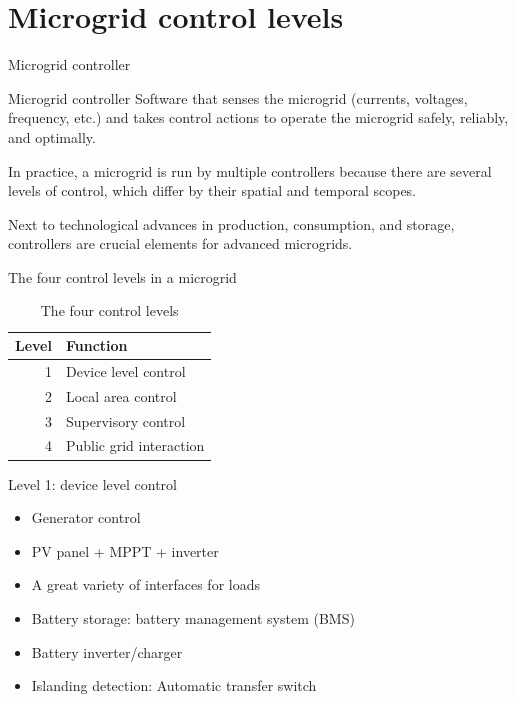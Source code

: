 \section{Microgrid control levels}

\begin{frame}{Microgrid controller}


\begin{block}{Microgrid controller}
Software that senses the microgrid (currents, voltages, frequency, etc.) and takes control actions to operate the microgrid safely, reliably, and optimally.
\end{block}

In practice, a microgrid is run by multiple controllers because there are several levels of control, which differ by their spatial and temporal scopes.

Next to technological advances in production, consumption, and storage, controllers are crucial elements for advanced microgrids.
\end{frame}

\begin{frame}{The four control levels in a microgrid}
 \begin{table}[H]
    \centering
    \caption{The four control levels}
    \begin{tabular}{@{} rl @{}}
	\toprule
	\textbf{Level} & \textbf{Function} \\
        \midrule
	1 & Device level control \\
	2 & Local area control \\
	3 & Supervisory control \\
	4 & Public grid interaction \\
      \bottomrule
    \end{tabular}
\end{table}
\end{frame}

\begin{frame}{Level 1: device level control}
\begin{itemize}
\item Generator control
\item PV panel + MPPT + inverter
\item A great variety of interfaces for loads
\item Battery storage: battery management system (BMS)
\item Battery inverter/charger
\item Islanding detection: Automatic transfer switch
\end{itemize}
\end{frame}


